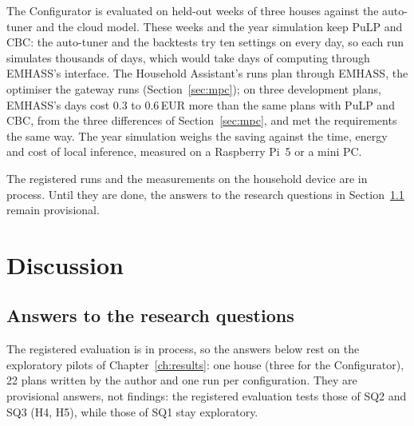The Configurator is evaluated on held-out weeks of three houses against
the auto-tuner and the cloud model. These weeks and the year simulation
keep PuLP and CBC: the auto-tuner and the backtests try ten settings on
every day, so each run simulates thousands of days, which would take
days of computing through EMHASS's interface. The Household Assistant's
runs plan through EMHASS, the optimiser the gateway runs
(Section~\ref{sec:mpc}); on three development plans, EMHASS's days cost
0.3 to 0.6\,EUR more than the same plans with PuLP and CBC, from the
three differences of Section~\ref{sec:mpc}, and met the requirements
the same way. The year simulation weighs the saving against the time,
energy and cost of local inference, measured on a Raspberry Pi~5 or a
mini PC.

The registered runs and the measurements on the household device are
in process. Until they are done, the answers to the research questions
in Section~\ref{sec:answers} remain provisional.

\chapter{Discussion}
\label{ch:discussion}

\section{Answers to the research questions}
\label{sec:answers}

The registered evaluation is in process, so the answers below rest on
the exploratory pilots of Chapter~\ref{ch:results}: one house (three
for the Configurator), 22 plans written by the author and one run per
configuration. They are
provisional answers, not findings: the registered evaluation tests
those of SQ2 and SQ3 (H4, H5), while those of SQ1 stay exploratory.

